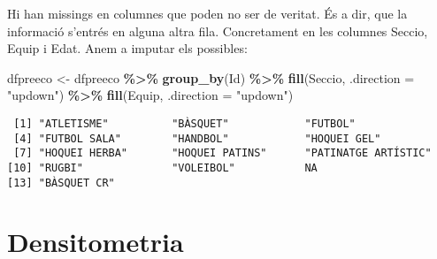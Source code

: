 \documentclass[
]{book}
\newenvironment{Shaded}{\begin{snugshade}}{\end{snugshade}}
\newcommand{\AttributeTok}[1]{\textcolor[rgb]{0.13,0.29,0.53}{#1}}
\newcommand{\ConstantTok}[1]{\textcolor[rgb]{0.56,0.35,0.01}{#1}}
\newcommand{\FunctionTok}[1]{\textcolor[rgb]{0.13,0.29,0.53}{\textbf{#1}}}
\newcommand{\NormalTok}[1]{#1}
\newcommand{\OtherTok}[1]{\textcolor[rgb]{0.56,0.35,0.01}{#1}}
\newcommand{\SpecialCharTok}[1]{\textcolor[rgb]{0.81,0.36,0.00}{\textbf{#1}}}
\newcommand{\StringTok}[1]{\textcolor[rgb]{0.31,0.60,0.02}{#1}}
\theoremstyle{definition}
\theoremstyle{definition}
\theoremstyle{definition}
\theoremstyle{definition}
\theoremstyle{remark}
\begin{document}
Hi han missings en columnes que poden no ser de veritat. És a dir, que la informació s'entrés en alguna altra fila. Concretament en les columnes Seccio, Equip i Edat. Anem a imputar els possibles:

\begin{Shaded}
\begin{Highlighting}[]
\NormalTok{dfpreeco }\OtherTok{\textless{}{-}}\NormalTok{ dfpreeco }\SpecialCharTok{\%\textgreater{}\%}
  \FunctionTok{group\_by}\NormalTok{(Id) }\SpecialCharTok{\%\textgreater{}\%}
  \FunctionTok{fill}\NormalTok{(Seccio, }\AttributeTok{.direction =} \StringTok{"updown"}\NormalTok{)  }\SpecialCharTok{\%\textgreater{}\%} 
  \FunctionTok{fill}\NormalTok{(Equip, }\AttributeTok{.direction =} \StringTok{"updown"}\NormalTok{) }
\end{Highlighting}
\end{Shaded}

\begin{Shaded}
\end{Shaded}

\begin{verbatim}
 [1] "ATLETISME"          "BÀSQUET"            "FUTBOL"            
 [4] "FUTBOL SALA"        "HANDBOL"            "HOQUEI GEL"        
 [7] "HOQUEI HERBA"       "HOQUEI PATINS"      "PATINATGE ARTÍSTIC"
[10] "RUGBI"              "VOLEIBOL"           NA                  
[13] "BÀSQUET CR"        
\end{verbatim}

\hypertarget{densitometria}{%
\section{Densitometria}\label{densitometria}}
\end{document}
